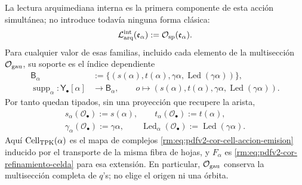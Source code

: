 La lectura arquimediana interna es la primera componente de esta acción
simultánea; no introduce todavía ninguna forma clásica:
\begin{equation}
\label{rm:eq:continuo-lector-arquimediano}
 \mathcal L_{\rm arq}^{\rm int}(\mathfrak e_\alpha)
 :=\mathcal O_{\rm sp}(\mathfrak e_\alpha).
\end{equation}
Para cualquier valor de esas familias, incluido cada elemento de la
multisección \(\mathcal O_{\rm gau}\), su soporte es el índice dependiente
\begin{equation}
\label{rm:eq:pdfv2-cor-soporte-dependiente}
 \begin{aligned}
 \mathsf B_\alpha&:=
 \{(s(\alpha),t(\alpha),\gamma\alpha,
          \operatorname{Led}(\gamma\alpha))\},\\
 \operatorname{supp}_\alpha:\mathsf Y_\bullet[\alpha]&\longrightarrow
 \mathsf B_\alpha,\qquad
 o\longmapsto(s(\alpha),t(\alpha),\gamma\alpha,
          \operatorname{Led}(\gamma\alpha)).
 \end{aligned}
\end{equation}
Por tanto quedan tipados, sin una proyección que recupere la arista,
\begin{equation}
\label{rm:eq:pdfv2-cor-soporte-cinco-lecturas}
 \begin{gathered}
 s_\alpha(\mathcal O_\bullet):=s(\alpha),\qquad
 t_\alpha(\mathcal O_\bullet):=t(\alpha),\\
 \gamma_\alpha(\mathcal O_\bullet):=\gamma\alpha,
 \qquad
 \operatorname{Led}_\alpha(\mathcal O_\bullet)
 :=\operatorname{Led}(\gamma\alpha).
 \end{gathered}
\end{equation}
Aquí \(\operatorname{Cell}_{\rm TPK}(\alpha)\) es el mapa de complejos
\eqref{rm:eq:pdfv2-cor-cell-accion-emision} inducido por el transporte de la
misma fibra de hojas, y \(F_\alpha\) es
\eqref{rm:eq:pdfv2-cor-refinamiento-celda} para esa extensión. En particular,
\(\mathcal O_{\rm gau}\) conserva la multisección completa de \(q\)'s; no
elige el origen ni una órbita.

